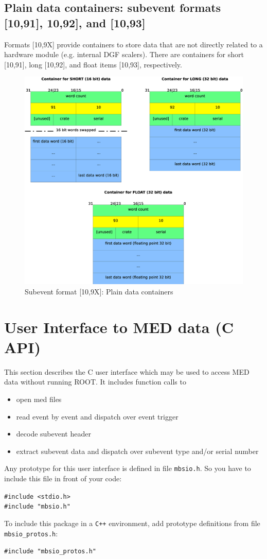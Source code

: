 \documentclass[10pt,a4paper]{article}
\newenvironment{blueboxed}
	{\begin{Sbox}\begin{minipage}[t]}
	{\end{minipage}\end{Sbox}\colorbox{lightblue}{\TheSbox}}
\begin{document}
\subsection{Plain data containers: subevent formats [10,91], 10,92], and [10,93]}
Formats [10,9X] provide containers to store data that are not directly related to a hardware module
(e.g. internal DGF scalers).
There are containers for short [10,91], long [10,92], and float items [10,93], respectively.
\begin{figure}[H]
\centerline{\includegraphics[width=.7\linewidth]{MedSevt_Data_X}}
\caption{Subevent format [10,9X]: Plain data containers}
\label{MedSevt_Data_X}
\end{figure}
\newpage
\section{User Interface to MED data (C API)}
This section describes the C user interface which may be used to access MED data without running ROOT.
It includes function calls to
\begin{itemize}
	\item	open med files
	\item	read event by event and dispatch over event trigger
	\item	decode subevent header
	\item	extract subevent data and dispatch over subevent type and/or serial number
\end{itemize}
Any prototype for this user interface is defined in file \verb+mbsio.h+.
So you have to include this file in front of your code:
\begin{center}
\begin{blueboxed}{.3\linewidth}
	\verb+#include <stdio.h>+\\
	\verb+#include "mbsio.h"+
\end{blueboxed}
\end{center}
To include this package in a \texttt{C++} environment, add prototype definitions from file \verb+mbsio_protos.h+:\hfill
\begin{center}
\begin{blueboxed}{.3\linewidth}
	\verb+#include "mbsio_protos.h"+
\end{blueboxed}
\end{center}\vspace{5mm}
\end{document}
